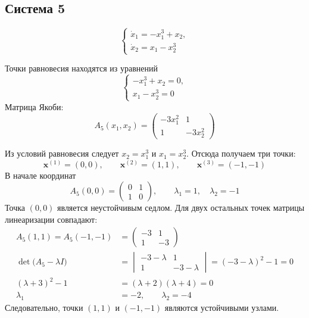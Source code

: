 
\subsection{Система 5}

\begin{equation}
  \begin{cases}
    \dot x_1=-x_1^3+x_2,\\
    \dot x_2=x_1-x_2^3
  \end{cases}
  \label{eq:system-5}
\end{equation}

Точки равновесия находятся из уравнений
\begin{equation}
  \begin{cases}
    -x_1^3+x_2=0,\\
    x_1-x_2^3=0
  \end{cases}
\end{equation}
Матрица Якоби:
\begin{equation}
  A_5(x_1,x_2)=
  \begin{pmatrix}
    -3x_1^2 & 1\\
    1 & -3x_2^2
  \end{pmatrix}
\end{equation}

Из условий равновесия следует $x_2=x_1^3$ и $x_1=x_2^3$. Отсюда
получаем три точки:
\begin{equation}
  \bm x^{(1)}=(0,0),\qquad
  \bm x^{(2)}=(1,1),\qquad
  \bm x^{(3)}=(-1,-1)
\end{equation}
В начале координат
\begin{equation}
  A_5(0,0)=
  \begin{pmatrix}
    0 & 1\\
    1 & 0
  \end{pmatrix},
  \qquad
  \lambda_1=1,\quad\lambda_2=-1
\end{equation}
Точка $(0,0)$ является неустойчивым седлом. Для двух остальных точек
матрицы линеаризации совпадают:
\begin{equation}
  \begin{aligned}
    A_5(1,1)=A_5(-1,-1)&=
    \begin{pmatrix}
      -3 & 1\\
      1 & -3
    \end{pmatrix}\\
    \det\bigl(A_5-\lambda I\bigr)
    &=
    \begin{vmatrix}
      -3-\lambda & 1\\
      1 & -3-\lambda
    \end{vmatrix}
    =(-3-\lambda)^2-1=0\\
    (\lambda+3)^2-1
    &=(\lambda+2)(\lambda+4)=0\\
    \lambda_1&=-2,\qquad \lambda_2=-4
  \end{aligned}
\end{equation}
Следовательно, точки $(1,1)$ и $(-1,-1)$ являются устойчивыми узлами.

